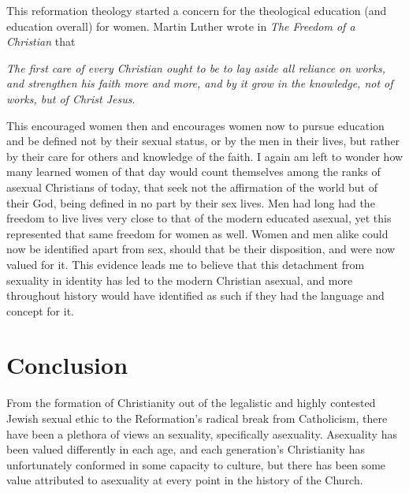 \documentclass[12pt]{article}
\begin{document}
    \par This reformation theology started a concern for the theological
        education (and education overall) for women. Martin Luther wrote in
        \textit{The Freedom of a Christian} that 
        \par \textit{The first care of every Christian ought to be to lay aside all reliance on works, and strengthen his faith more and more, and by it grow in the knowledge, not of works, but of Christ Jesus}\cite{lutherfem}\cite{luther31}.
        
    \par This encouraged women then and encourages women now to pursue education
        and be defined not by their sexual status, or by the men in their lives,
        but rather by their care for others and knowledge of the faith. I 
        again am left to wonder how many learned women of that day would
        count themselves among the ranks of asexual 
        Christians of today, that seek
        not the affirmation of the world but of their God, being defined in
        no part by their sex lives. Men had long had the freedom to live
        lives very close to that of the modern educated asexual, yet
        this represented that same freedom for women as well. Women and men 
        alike could now be identified apart from sex, should that be their
        disposition, and were now valued for it.
        This evidence leads me to believe that this detachment from 
        sexuality in identity has led to the modern Christian asexual, and
        more throughout history would have identified as such if they
        had the language and concept for it.
    
\section{Conclusion}

    \par From the formation of Christianity out of the legalistic and highly
        contested Jewish sexual ethic to the Reformation's radical break 
        from Catholicism, there have been a plethora of views an sexuality,
        specifically asexuality. Asexuality has been valued differently in
        each age, and each generation's Christianity has unfortunately
        conformed in some capacity to culture, but there has been some
        value attributed to asexuality at every point in the history of 
        the Church.

  

\end{document}
